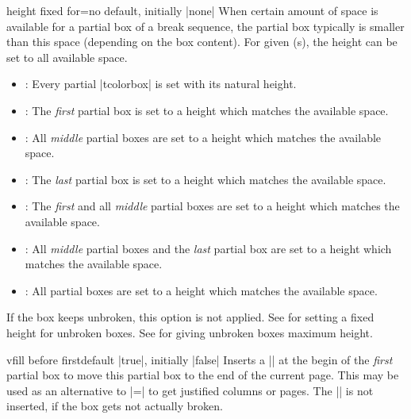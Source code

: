 \begin{docTcbKey}{height fixed for}{=}{no default, initially |none|}
  When certain amount of space is available for a partial box of a
  break sequence, the partial box typically is smaller than this space
  (depending on the box content). For given (s), the height can be
  set to all available space.
  \begin{itemize}
  \item{}: Every partial |tcolorbox| is set with its natural height.
  \item{}: The \emph{first} partial box is set to a height which matches the available space.
  \item{}: All \emph{middle} partial boxes are set to a height which matches the available space.
  \item{}: The \emph{last} partial box is set to a height which matches
    the available space.
  \item{}: The \emph{first} and
    all \emph{middle} partial boxes are set to a height which matches the available space.
  \item{}: All \emph{middle} partial boxes and the \emph{last} partial box
    are set to a height which matches the available space.
  \item{}: All partial boxes are set to a height which matches the available space.
  \end{itemize}
\begin{marker}
  If the box keeps unbroken, this option is not applied.
  See  for setting a fixed height for unbroken boxes.
  See  for giving unbroken boxes maximum height.
\end{marker}
\end{docTcbKey}


\begin{docTcbKey}{vfill before first}{}{default |true|, initially |false|}
  Inserts a |\vfill| at the begin of the \emph{first} partial box to move this
  partial box to the end of the current page. This may be used as an alternative
  to |=| to get justified
  columns or pages. The |\vfill| is not inserted, if the box gets not
  actually broken.
\end{docTcbKey}

\clearpage
